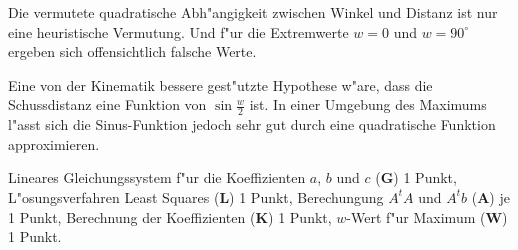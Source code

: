 \begin{diskussion}
Die vermutete quadratische Abh"angigkeit zwischen Winkel und Distanz
ist nur eine heuristische Vermutung.
Und f"ur die Extremwerte $w=0$ und $w=90^\circ$ ergeben sich offensichtlich
falsche Werte.

Eine von der Kinematik bessere gest"utzte Hypothese w"are, dass
die Schussdistanz eine Funktion von $\sin \frac{w}2$ ist.
In einer Umgebung des Maximums l"asst sich die Sinus-Funktion jedoch
sehr gut durch eine quadratische Funktion approximieren.
\end{diskussion}

\begin{bewertung}
Lineares Gleichungssystem f"ur die Koeffizienten $a$, $b$ und $c$ ({\bf G})
1 Punkt,
L"osungsverfahren Least Squares ({\bf L}) 1 Punkt,
Berechungung $A^tA$ und $A^tb$ ({\bf A}) je 1 Punkt,
Berechnung der Koeffizienten ({\bf K}) 1 Punkt,
$w$-Wert f"ur Maximum ({\bf W}) 1 Punkt.
\end{bewertung}

